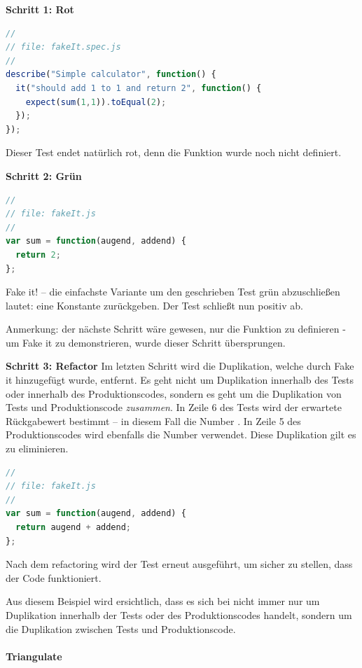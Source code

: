 \textbf{Schritt 1: Rot}
\begin{lstlisting}[language=JavaScript]
//
// file: fakeIt.spec.js
//
describe("Simple calculator", function() {
  it("should add 1 to 1 and return 2", function() {
    expect(sum(1,1)).toEqual(2);
  });
});
\end{lstlisting}
Dieser Test endet natürlich rot, denn die Funktion  wurde noch nicht definiert.

\textbf{Schritt 2: Grün}
\begin{lstlisting}[language=JavaScript]
//
// file: fakeIt.js
//
var sum = function(augend, addend) {
  return 2;
};
\end{lstlisting}

Fake it! -- die einfachste Variante um den geschrieben Test grün abzuschließen lautet: eine Konstante zurückgeben. Der Test schließt nun positiv ab.

Anmerkung: der nächste Schritt wäre gewesen, nur die Funktion  zu definieren - um Fake it zu demonstrieren, wurde dieser Schritt übersprungen.

\textbf{Schritt 3: Refactor} \newline
Im letzten Schritt wird die Duplikation, welche durch Fake it hinzugefügt wurde, entfernt. Es geht nicht um Duplikation innerhalb des Tests oder innerhalb des Produktionscodes, sondern es geht um die Duplikation von Tests und Produktionscode \textit{zusammen}. In Zeile 6 des Tests wird der erwartete Rückgabewert bestimmt -- in diesem Fall die Number \glqq{2\grqq}. In Zeile 5 des Produktionscodes wird ebenfalls die Number \glqq{2\grqq} verwendet. Diese Duplikation gilt es zu eliminieren.

\begin{lstlisting}[language=JavaScript]
//
// file: fakeIt.js
//
var sum = function(augend, addend) {
  return augend + addend;
};
\end{lstlisting}

Nach dem refactoring wird der Test erneut ausgeführt, um sicher zu stellen, dass der Code funktioniert.

Aus diesem Beispiel wird ersichtlich, dass es sich bei  nicht immer nur um Duplikation innerhalb der Tests oder des Produktionscodes handelt, sondern um die Duplikation zwischen Tests und Produktionscode.

\paragraph{Triangulate}


